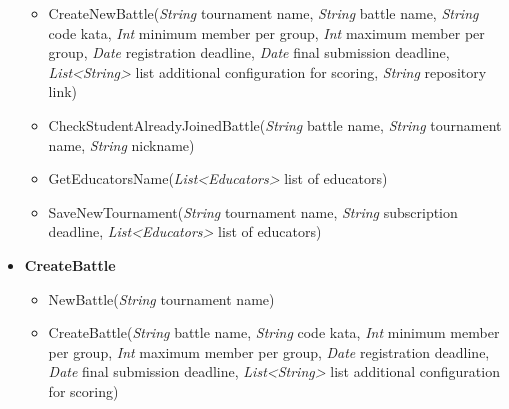 \begin{itemize}
\begin{itemize}
        \item CreateNewBattle(\textit{String} tournament name, \textit{String} battle name, \textit{String} code kata, \textit{Int}  minimum member per group, \textit{Int}  maximum member per group, \textit{Date} registration deadline, \textit{Date} final submission deadline, \textit{List\textless String\textgreater} list additional configuration for scoring, \textit{String} repository link)
        \item CheckStudentAlreadyJoinedBattle(\textit{String} battle name, \textit{String} tournament name, \textit{String} nickname)
        \item GetEducatorsName(\textit{List\textless Educators\textgreater} list of educators)
        \item SaveNewTournament(\textit{String} tournament name, \textit{String} subscription deadline, \textit{List\textless Educators\textgreater} list of educators)
\end{itemize}

    \item \textbf{\textbf{CreateBattle}}

\begin{itemize}
        \item NewBattle(\textit{String} tournament name)
        \item CreateBattle(\textit{String} battle name, \textit{String} code kata, \textit{Int}  minimum member per group, \textit{Int}  maximum member per group, \textit{Date} registration deadline, \textit{Date} final submission deadline, \textit{List\textless String\textgreater} list additional configuration for scoring)
\end{itemize}

\end{itemize}

